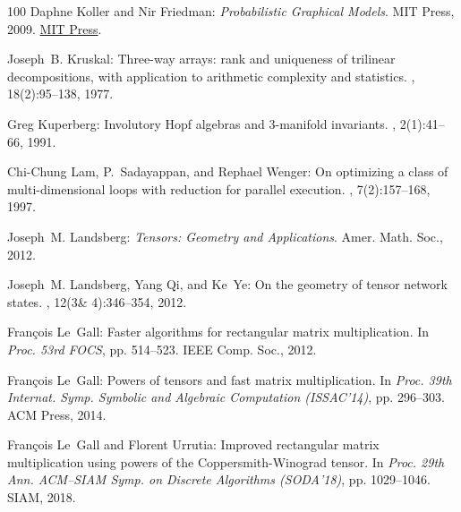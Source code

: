 \begin{thebibliography}{100}
{\sc Daphne Koller and Nir Friedman}: {\em Probabilistic Graphical Models}.
\newblock MIT Press, 2009.
\newblock
  \href{https://mitpress.mit.edu/books/probabilistic-graphical-models}{MIT
  Press}.

{\sc Joseph~B. Kruskal}: Three-way arrays: rank and uniqueness of trilinear
  decompositions, with application to arithmetic complexity and statistics.
, 18(2):95--138, 1977.
\newblock [\epfmtdoi{10.1016/0024-3795(77)90069-6}]

{\sc Greg Kuperberg}: Involutory {H}opf algebras and {$3$}-manifold invariants.
, 2(1):41--66, 1991.
\newblock [\epfmtdoi{10.1142/S0129167X91000053}]

{\sc Chi-Chung Lam, P.~Sadayappan, and Rephael Wenger}: On optimizing a class
  of multi-dimensional loops with reduction for parallel execution.
, 7(2):157--168, 1997.
\newblock [\epfmtdoi{10.1142/S0129626497000176}]

{\sc Joseph~M. Landsberg}: {\em Tensors: Geometry and Applications}.
\newblock Amer. Math. Soc., 2012.

{\sc Joseph~M. Landsberg, Yang Qi, and Ke~Ye}: On the geometry of tensor
  network states.
, 12(3\& 4):346--354, 2012.

{\sc Fran{\c{c}}ois Le~Gall}: Faster algorithms for rectangular matrix
  multiplication.
\newblock In {\em Proc. 53rd FOCS}, pp. 514--523. IEEE Comp. Soc., 2012.

{\sc Fran{\c{c}}ois Le~Gall}: Powers of tensors and fast matrix multiplication.
\newblock In {\em Proc. 39th Internat. Symp. Symbolic and Algebraic Computation
  (ISSAC'14)}, pp. 296--303. ACM Press, 2014.

{\sc Fran{\c{c}}ois Le~Gall and Florent Urrutia}: Improved rectangular matrix
  multiplication using powers of the {C}oppersmith-{W}inograd tensor.
\newblock In {\em Proc. 29th Ann. ACM--SIAM Symp. on Discrete Algorithms
  (SODA'18)}, pp. 1029--1046. SIAM, 2018.


\end{thebibliography}
